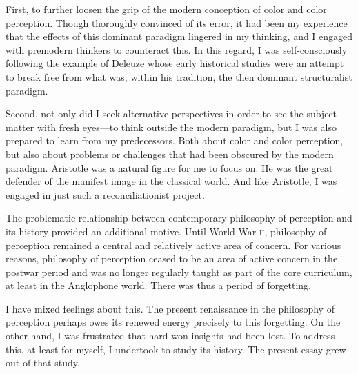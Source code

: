 First, to further loosen the grip of the modern conception of color and color perception. Though thoroughly convinced of its error, it had been my experience that the effects of this dominant paradigm lingered in my thinking, and I engaged with premodern thinkers to counteract this. In this regard, I was self-consciously following the example of Deleuze whose early historical studies were an attempt to break free from what was, within his tradition, the then dominant structuralist paradigm.

Second, not only did I seek alternative perspectives in order to see the subject matter with fresh eyes---to think outside the modern paradigm, but I was also prepared to learn from my predecessors. Both about color and color perception, but also about problems or challenges that had been obscured by the modern paradigm. Aristotle was a natural figure for me to focus on. He was the great defender of the manifest image in the classical world. And like Aristotle, I was engaged in just such a reconciliationist project.

The problematic relationship between contemporary philosophy of perception and its history provided an additional motive. Until World War \textsc{ii}, philosophy of perception remained a central and relatively active area of concern. For various reasons, philosophy of perception ceased to be an area of active concern in the postwar period and was no longer regularly taught as part of the core curriculum, at least in the Anglophone world. There was thus a period of forgetting. 

I have mixed feelings about this. The present renaissance in the philosophy of perception perhaps owes its renewed energy precisely to this forgetting. On the other hand, I was frustrated that hard won insights had been lost. To address this, at least for myself, I undertook to study its history. The present essay grew out of that study.

